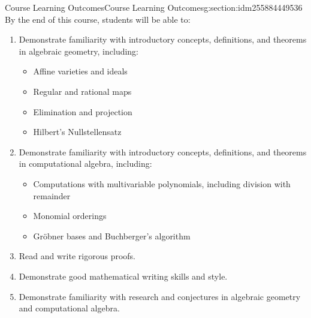 \documentclass[oneside,10pt,]{article}
\begin{document}
%
%
\typeout{************************************************}
\typeout{************************************************}
%
\begin{sectionptx}{Course Learning Outcomes}{}{Course Learning Outcomes}{}{}{g:section:idm255884449536}
By the end of this course, students will be able to:%
\begin{enumerate}
\item{}Demonstrate familiarity with introductory concepts, definitions, and theorems in algebraic geometry, including:%
\begin{itemize}[label=\textbullet]
\item{}Affine varieties and ideals%
\item{}Regular and rational maps%
\item{}Elimination and projection%
\item{}Hilbert's Nullstellensatz%
\end{itemize}
%
\item{}Demonstrate familiarity with introductory concepts, definitions, and theorems in computational algebra, including:%
\begin{itemize}[label=\textbullet]
\item{}Computations with multivariable polynomials, including division with remainder%
\item{}Monomial orderings%
\item{}Gröbner bases and Buchberger's algorithm%
\end{itemize}
%
\item{}Read and write rigorous proofs.%
\item{}Demonstrate good mathematical writing skills and style.%
\item{}Demonstrate familiarity with research and conjectures in algebraic geometry and computational algebra.%
\end{enumerate}
%
\end{sectionptx}
%
%
\typeout{************************************************}
\typeout{************************************************}
%
\end{document}
